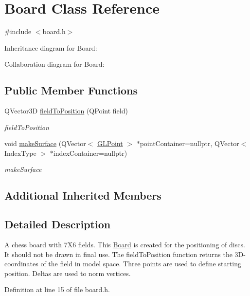 \hypertarget{class_board}{}\section{Board Class Reference}
\label{class_board}


{\ttfamily \#include $<$board.\+h$>$}



Inheritance diagram for Board\+:


Collaboration diagram for Board\+:
\subsection*{Public Member Functions}
\begin{DoxyCompactItemize}
\item 
Q\+Vector3D \mbox{\hyperlink{class_board_a15ff6efe6bd967a60f6b12ce59e5c27a}{field\+To\+Position}} (Q\+Point field)
\begin{DoxyCompactList}\small\item\em field\+To\+Position \end{DoxyCompactList}\item 
void \mbox{\hyperlink{class_board_a4a8568ce7d13db61b01e6bf14e7b12fd}{make\+Surface}} (Q\+Vector$<$ \mbox{\hyperlink{class_g_l_point}{G\+L\+Point}} $>$ $\ast$point\+Container=nullptr, Q\+Vector$<$ Index\+Type $>$ $\ast$index\+Container=nullptr)
\begin{DoxyCompactList}\small\item\em make\+Surface \end{DoxyCompactList}\end{DoxyCompactItemize}
\subsection*{Additional Inherited Members}


\subsection{Detailed Description}
A chess board with 7X6 fields. This \mbox{\hyperlink{class_board}{Board}} is created for the positioning of discs. It should not be drawn in final use. The field\+To\+Position function returns the 3D-\/coordinates of the field in model space. Three points are used to define starting position. Deltas are used to norm vertices. 

Definition at line 15 of file board.\+h.



